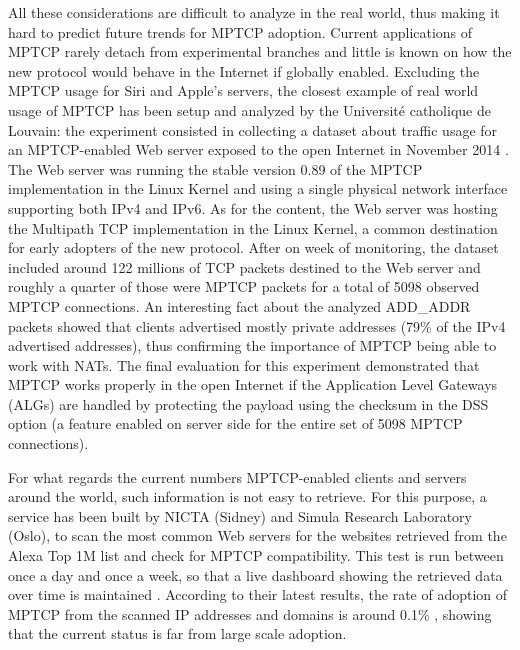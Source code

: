 All these considerations are difficult to analyze in the real world, thus making it hard to predict future trends for MPTCP adoption. Current applications of MPTCP rarely detach from experimental branches and little is known on how the new protocol would behave in the Internet if globally enabled. Excluding the MPTCP usage for Siri and Apple's servers, the closest example of real world usage of MPTCP has been setup and analyzed by the Université catholique de Louvain: the experiment consisted in collecting a dataset about traffic usage for an MPTCP-enabled Web server exposed to the open Internet in November 2014 \cite{HTSB15}. The Web server was running the stable version 0.89 of the MPTCP implementation in the Linux Kernel and using a single physical network interface supporting both IPv4 and IPv6. As for the content, the Web server was hosting the Multipath TCP implementation in the Linux Kernel, a common destination for early adopters of the new protocol. After on week of monitoring, the dataset included around 122 millions of TCP packets destined to the Web server and roughly a quarter of those were MPTCP packets for a total of 5098 observed MPTCP connections. 
An interesting fact about the analyzed ADD\_ADDR packets showed that clients advertised mostly private addresses (79\% of the IPv4 advertised addresses), thus confirming the importance of MPTCP being able to work with NATs. 
The final evaluation for this experiment demonstrated that MPTCP works properly in the open Internet if the Application Level Gateways (ALGs) are handled by protecting the payload using the checksum in the DSS option (a feature enabled on server side for the entire set of 5098 MPTCP connections).

For what regards the current numbers MPTCP-enabled clients and servers around the world, such information is not easy to retrieve. For this purpose, a service has been built by NICTA (Sidney) and Simula Research Laboratory (Oslo), to scan the most common Web servers for the websites retrieved from the Alexa Top 1M list and check for MPTCP compatibility. This test is run between once a day and once a week, so that a live dashboard showing the retrieved data over time is maintained \cite{dashboard}. According to their latest results, the rate of adoption of MPTCP from the scanned IP addresses and domains is around 0.1\% \cite{Mehani:2015:ELM:2798087.2798088}, showing that the current status is far from large scale adoption.